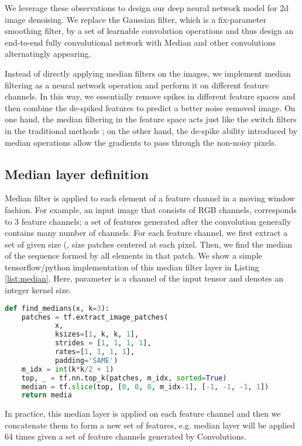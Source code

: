 \documentclass[journal]{IEEEtran}
\begin{document}
We leverage these observations to design our deep neural network model for 2d image denoising. We replace the Gaussian filter, which is a fix-parameter smoothing filter, by a set of learnable convolution operations and thus design an end-to-end fully convolutional network with Median and other convolutions alternatingly appearing.

Instead of directly applying median filters on the images, we implement median filtering as a neural network operation and perform it on different feature channels. In this way, we essentially remove spikes in different feature spaces and then combine the de-spiked features to predict a better noise removed image. On one hand, the median filtering in the feature space acts just like the switch filters in the traditional methods \cite{Wang2011,Fu2018Multimedia}; on the other hand, the de-spike ability introduced by median operations allow the gradients to pass through the non-noisy pixels.

\subsection{Median layer definition}

Median filter is applied to each element of a feature channel in a moving window fashion. For example, an input image that consists of RGB channels, corresponds to 3 feature channels; a set of features generated after the convolution generally contains many number of channels. For each feature channel, we first extract a set of given size (,  size patches centered at each pixel. Then, we find the median of the sequence formed by all elements in that patch. We show a simple tensorflow/python implementation of this median filter layer in Listing \ref{list:median}. Here, parameter  is a channel of the input tensor and  denotes an integer kernel size.

\begin{lstlisting}[language=Python, basicstyle=\tiny, label={list:median}, caption={Tensorflow implementation of Median layer},captionpos=b]
def find_medians(x, k=3):
    patches = tf.extract_image_patches(
            x,
            ksizes=[1, k, k, 1],
            strides = [1, 1, 1, 1],
            rates=[1, 1, 1, 1],
            padding='SAME')
    m_idx = int(k*k/2 + 1)
    top, _ = tf.nn.top_k(patches, m_idx, sorted=True)
    median = tf.slice(top, [0, 0, 0, m_idx-1], [-1, -1, -1, 1])
    return media
\end{lstlisting}

In practice, this median layer is applied on each feature channel and then we concatenate them to form a new set of features, e.g. median layer will be applied 64 times given a set of  feature channels generated by Convolutions.
\end{document}
